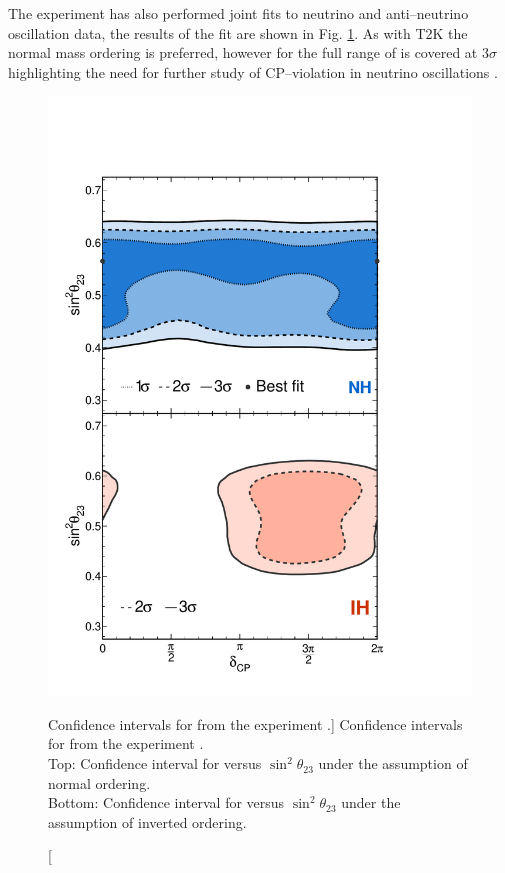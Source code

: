 {The \nova{} experiment has also performed joint fits to neutrino and
anti--neutrino oscillation data, the results of the fit are shown in Fig.
\ref{fig:nova_cp}. As with T2K the normal mass ordering is preferred, however
for \nova{} the full range of \dcp{} is covered at $3\sigma$ highlighting the 
need for further study of CP--violation in neutrino oscillations
\cite{PhysRevLett.123.151803}.

\begin{figure}
	\centering
	\includegraphics[height=0.7\textheight]{figures/nova_dcp.pdf}
	\caption
	[Confidence intervals for \dcp{} from the \nova{} experiment 
	\cite{PhysRevLett.123.151803}.]
	{Confidence intervals for \dcp{} from the \nova{} experiment 
	\cite{PhysRevLett.123.151803}. \\
	Top: Confidence interval for \dcp{} versus $\sin^2\theta_{23}$ under the
	assumption of normal ordering.\\
	Bottom: Confidence interval for \dcp{} versus $\sin^2\theta_{23}$ under the
	assumption of inverted ordering.\\
	}
	\label{fig:nova_cp}
\end{figure}

}
